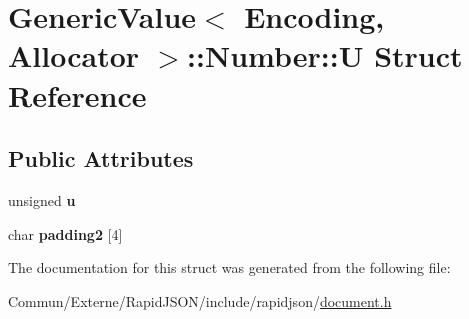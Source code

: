 \hypertarget{struct_generic_value_1_1_number_1_1_u}{}\section{Generic\+Value$<$ Encoding, Allocator $>$\+:\+:Number\+:\+:U Struct Reference}
\label{struct_generic_value_1_1_number_1_1_u}
\subsection*{Public Attributes}
\begin{DoxyCompactItemize}
\item 
unsigned {\bfseries u}\hypertarget{struct_generic_value_1_1_number_1_1_u_a175e3a2bd43e6880791eb7c950d2f147}{}\label{struct_generic_value_1_1_number_1_1_u_a175e3a2bd43e6880791eb7c950d2f147}

\item 
char {\bfseries padding2} \mbox{[}4\mbox{]}\hypertarget{struct_generic_value_1_1_number_1_1_u_a9341f65c1645f24fd001a1ebf58d3c5b}{}\label{struct_generic_value_1_1_number_1_1_u_a9341f65c1645f24fd001a1ebf58d3c5b}

\end{DoxyCompactItemize}


The documentation for this struct was generated from the following file\+:\begin{DoxyCompactItemize}
\item 
Commun/\+Externe/\+Rapid\+J\+S\+O\+N/include/rapidjson/\hyperlink{document_8h}{document.\+h}\end{DoxyCompactItemize}
